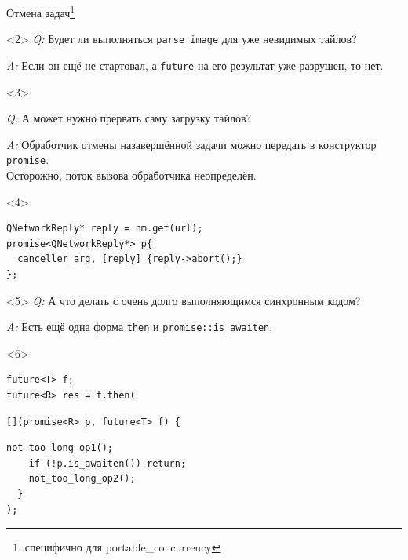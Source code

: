 \documentclass[aspectratio=169,pdf,hyperref={unicode},17pt]{beamer}
\begin{document}
\begin{frame}[fragile,t]{Отмена задач\footnote{специфично для portable\_concurrency}}
\begin{onlyenv}<2>
{\em Q:} Будет ли выполняться \texttt{parse\_image} для уже невидимых тайлов?

{\em A:} Если он ещё не стартовал, а \texttt{future} на его результат уже разрушен, то нет.
\end{onlyenv}
\begin{onlyenv}<3>

{\em Q:} А может нужно прервать саму загрузку тайлов?

{\em A:} Обработчик отмены назавершённой задачи можно передать в конструктор \texttt{promise}.\\
\footnotesize{Осторожно, поток вызова обработчика неопределён.}
\end{onlyenv}
\begin{onlyenv}<4>
\begin{lstlisting}[style=cppcode]
QNetworkReply* reply = nm.get(url);
promise<QNetworkReply*> p{
  canceller_arg, [reply] {reply->abort();}
};
\end{lstlisting}
\end{onlyenv}
\begin{onlyenv}<5>
{\em Q:} А что делать с очень долго выполняющимся синхронным кодом?

{\em A:} Есть ещё одна форма \texttt{then} и \texttt{promise::is\_awaiten}.
\end{onlyenv}
\begin{onlyenv}<6>
\begin{lstlisting}[style=cppcode,aboveskip=0pt,belowskip=0pt]
future<T> f;
future<R> res = f.then(
\end{lstlisting}
\begin{lstlisting}[style=cppcode,backgroundcolor=\color{gray!30},aboveskip=0pt,belowskip=0pt]
  [](promise<R> p, future<T> f) {
\end{lstlisting}
\begin{lstlisting}[style=cppcode,aboveskip=0pt,belowskip=0pt]
    not_too_long_op1();
    if (!p.is_awaiten()) return;
    not_too_long_op2();
  }
);
\end{lstlisting}
\end{onlyenv}
\end{frame}
\end{document}
